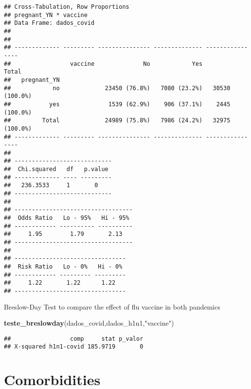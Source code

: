 \documentclass[
]{article}
\newenvironment{Shaded}{\begin{snugshade}}{\end{snugshade}}
\newcommand{\KeywordTok}[1]{\textcolor[rgb]{0.13,0.29,0.53}{\textbf{#1}}}
\newcommand{\NormalTok}[1]{#1}
\newcommand{\StringTok}[1]{\textcolor[rgb]{0.31,0.60,0.02}{#1}}
\begin{document}
\begin{verbatim}
## Cross-Tabulation, Row Proportions  
## pregnant_YN * vaccine  
## Data Frame: dados_covid  
## 
## 
## ------------- --------- --------------- -------------- ----------------
##                 vaccine              No            Yes            Total
##   pregnant_YN                                                          
##            no             23450 (76.8%)   7080 (23.2%)   30530 (100.0%)
##           yes              1539 (62.9%)    906 (37.1%)    2445 (100.0%)
##         Total             24989 (75.8%)   7986 (24.2%)   32975 (100.0%)
## ------------- --------- --------------- -------------- ----------------
## 
## ----------------------------
##  Chi.squared   df   p.value 
## ------------- ---- ---------
##   236.3533     1       0    
## ----------------------------
## 
## ----------------------------------
##  Odds Ratio   Lo - 95%   Hi - 95% 
## ------------ ---------- ----------
##     1.95        1.79       2.13   
## ----------------------------------
## 
## --------------------------------
##  Risk Ratio   Lo - 0%   Hi - 0% 
## ------------ --------- ---------
##     1.22       1.22      1.22   
## --------------------------------
\end{verbatim}

Breslow-Day Test to compare the effect of flu vaccine in both pandemics

\begin{Shaded}
\begin{Highlighting}[]
\KeywordTok{teste_breslowday}\NormalTok{(dados_covid,dados_h1n1,}\StringTok{"vaccine"}\NormalTok{)}
\end{Highlighting}
\end{Shaded}

\begin{verbatim}
##                 comp     stat p_valor
## X-squared h1n1-covid 185.9719       0
\end{verbatim}

\hypertarget{comorbidities}{%
\section{Comorbidities}\label{comorbidities}}
\end{document}
